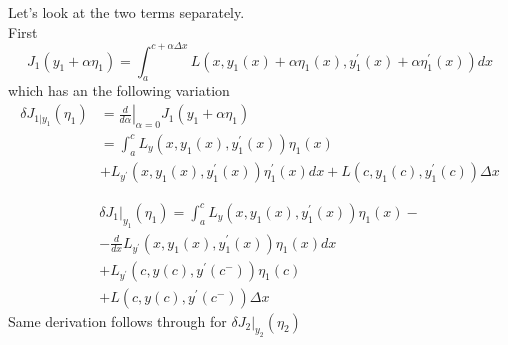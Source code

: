 \documentclass{beamer}
\begin{document}
    \begin{frame}
        Let's look at the two terms separately.\\
        First
        \begin{equation*}
            J _ { 1 } \left( y _ { 1 } + \alpha \eta _ { 1 } \right) = \int _ { a } ^ { c + \alpha \Delta x } L \left( x , y _ { 1 } ( x ) + \alpha \eta _ { 1 } ( x ) , y _ { 1 } ^ { \prime } ( x ) + \alpha \eta _ { 1 } ^ { \prime } ( x ) \right) d x
        \end{equation*}
        which has an the following variation
        \begin{equation*}
            \begin{aligned} \delta J _ { 1 | y _ { 1 } } \left( \eta _ { 1 } \right) & = \left. \frac { d } { d \alpha } \right| _ { \alpha = 0 } J _ { 1 } \left( y _ { 1 } + \alpha \eta _ { 1 } \right) \\
                & = \int _ { a } ^ { c }  L _ { y } \left( x , y _ { 1 } ( x ) , y _ { 1 } ^ { \prime } ( x ) \right) \eta _ { 1 } ( x ) \\
                &+ L _ { y ^ { \prime } } \left( x , y _ { 1 } ( x ) , y _ { 1 } ^ { \prime } ( x ) \right) \eta _ { 1 } ^ { \prime } ( x )  d x  + L \left( c , y _ { 1 } ( c ) , y _ { 1 } ^ { \prime } ( c ) \right) \Delta x
            \end{aligned}
        \end{equation*}
    \end{frame}
    \begin{frame}
        \begin{equation*}
            \begin{split}
                \delta \left. J _ { 1 } \right| _ { y _ { 1 } } \left( \eta _ { 1 } \right) = \int _ { a } ^ { c } L _ { y } \left( x , y _ { 1 } ( x ) , y _ { 1 } ^ { \prime } ( x ) \right) \eta _ { 1 } ( x ) - \\
                - \frac { d } { d x } L _ { y ^ { \prime } } \left( x , y _ { 1 } ( x ) , y _ { 1 } ^ { \prime } ( x ) \right) \eta _ { 1 } ( x ) d x\\
                + L _ { y ^ { \prime } } \left( c , y ( c ) , y ^ { \prime } \left( c ^ { - } \right) \right) \eta _ { 1 } ( c )\\
                + L \left( c , y ( c ) , y ^ { \prime } \left( c ^ { - } \right) \right) \Delta x
            \end{split}
        \end{equation*}
        Same derivation follows through for \(\delta J_2\vert_{y_2}(\eta_2)\)
    \end{frame}
\end{document}
